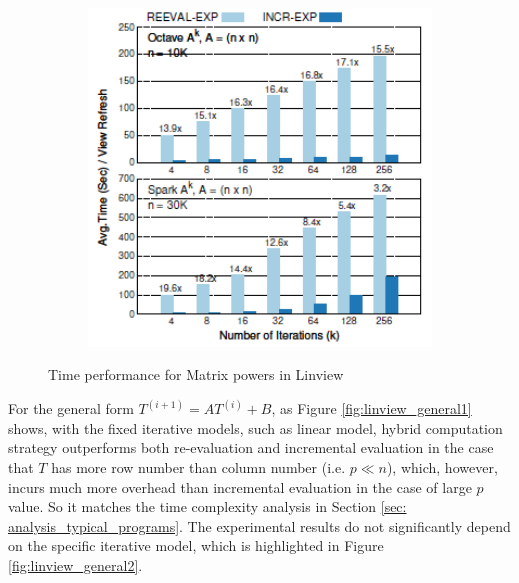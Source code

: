 \begin{figure}[h]
\begin{subfigure}{0.3\textwidth}
        \includegraphics[height = 1.5\textwidth, width=1.2\textwidth]{Figures/linview_matrix_power_exp3.png}
    \caption{}
    \label{fig:linview_matrix_powers3}
    \end{subfigure}
    \caption{Time performance for Matrix powers in Linview}
\end{figure}

For the general form $T^{(i+1)} = AT^{(i)} + B$, as Figure \ref{fig:linview_general1} shows, with the fixed iterative models, such as linear model, hybrid computation strategy outperforms both re-evaluation and incremental evaluation in the case that $T$ has more row number than column number (i.e. $p \ll n$), which, however, incurs much more overhead than incremental evaluation in the case of large $p$ value. So it matches the time complexity analysis in Section \ref{sec: analysis_typical_programs}. The experimental results do not significantly depend on the specific iterative model, which is highlighted in Figure \ref{fig:linview_general2}.




